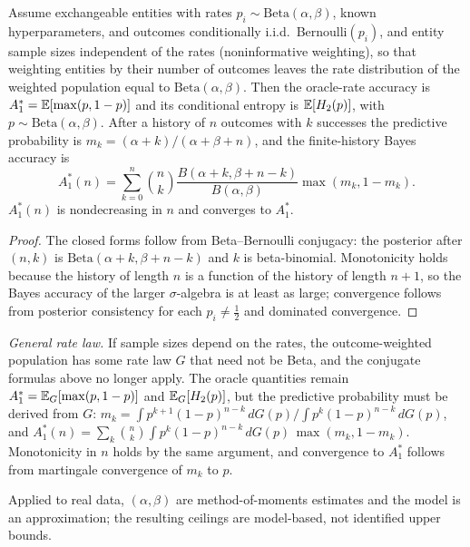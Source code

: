 \begin{proposition}\label{prop:appbeta}
Assume exchangeable entities with rates $p_i\sim\mathrm{Beta}(\alpha,\beta)$, known hyperparameters, and outcomes conditionally i.i.d.\ Bernoulli$(p_i)$, and entity sample sizes independent of the rates (noninformative weighting), so that weighting entities by their number of outcomes leaves the rate distribution of the weighted population equal to $\mathrm{Beta}(\alpha,\beta)$. Then the oracle-rate accuracy is $A_1^*=\mathbb{E}[\max(p,1-p)]$ and its conditional entropy is $\mathbb{E}[H_2(p)]$, with $p\sim\mathrm{Beta}(\alpha,\beta)$. After a history of $n$ outcomes with $k$ successes the predictive probability is $m_k=(\alpha+k)/(\alpha+\beta+n)$, and the finite-history Bayes accuracy is
\[
A_1^*(n)=\sum_{k=0}^{n}\binom{n}{k}\frac{B(\alpha+k,\beta+n-k)}{B(\alpha,\beta)}\max(m_k,1-m_k).
\]
$A_1^*(n)$ is nondecreasing in $n$ and converges to $A_1^*$.
\end{proposition}
\begin{proof}
The closed forms follow from Beta--Bernoulli conjugacy: the posterior after $(n,k)$ is $\mathrm{Beta}(\alpha+k,\beta+n-k)$ and $k$ is beta-binomial. Monotonicity holds because the history of length $n$ is a function of the history of length $n+1$, so the Bayes accuracy of the larger $\sigma$-algebra is at least as large; convergence follows from posterior consistency for each $p_i\neq\tfrac12$ and dominated convergence.
\end{proof}
\emph{General rate law.} If sample sizes depend on the rates, the outcome-weighted population has some rate law $G$ that need not be Beta, and the conjugate formulas above no longer apply. The oracle quantities remain $A_1^*=\mathbb{E}_G[\max(p,1-p)]$ and $\mathbb{E}_G[H_2(p)]$, but the predictive probability must be derived from $G$: $m_k=\int p^{k+1}(1-p)^{n-k}\,dG(p)\big/\int p^{k}(1-p)^{n-k}\,dG(p)$, and $A_1^*(n)=\sum_{k}\binom nk\int p^k(1-p)^{n-k}\,dG(p)\,\max(m_k,1-m_k)$. Monotonicity in $n$ holds by the same argument, and convergence to $A_1^*$ follows from martingale convergence of $m_k$ to $p$.

Applied to real data, $(\alpha,\beta)$ are method-of-moments estimates and the model is an approximation; the resulting ceilings are model-based, not identified upper bounds.

